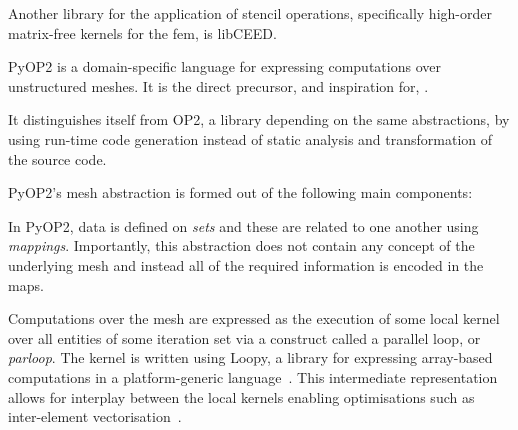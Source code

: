 

Another library for the application of stencil operations, specifically high-order matrix-free kernels for the \gls{fem}, is libCEED.

PyOP2 is a domain-specific language for expressing computations over unstructured meshes.
It is the direct precursor, and inspiration for, \projectname.

It distinguishes itself from OP2, a library depending on the same abstractions, by using run-time code generation instead of static analysis and transformation of the source code.

PyOP2's mesh abstraction is formed out of the following main components:


In PyOP2, data is defined on \textit{sets} and these are related to one another using \textit{mappings}.
Importantly, this abstraction does not contain any concept of the underlying mesh and instead all of the required information is encoded in the maps.

  Computations over the mesh are expressed as the execution of some local kernel over all entities of some iteration set via a construct called a parallel loop, or \textit{parloop}.
  The kernel is written using Loopy, a library for expressing array-based computations in a platform-generic language~\cite{klocknerLooPyTransformationbased2014}.
  This intermediate representation allows for interplay between the local kernels enabling optimisations such as inter-element vectorisation~\cite{sunStudyVectorizationMatrixfree2020}.

